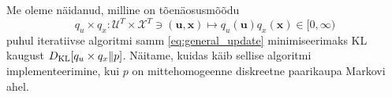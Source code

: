 



Me oleme näidanud, milline on tõenäosusmõõdu 
$$q_u \times q_x: \mathcal{U}^T \times \mathcal{X}^T \ni (\bm{u},\bm{x}) \mapsto q_u(\bm{u}) q_x(\bm{x}) \in [0, \infty)$$ 
puhul iteratiivse algoritmi samm \eqref{eq:general_update} minimiseerimaks KL kaugust $ D_{\mathrm{KL}}[q_u \times q_x \| p]$. Näitame, kuidas käib sellise algoritmi implementeerimine, kui $p$ on mittehomogeenne diskreetne paarikaupa Markovi ahel.

